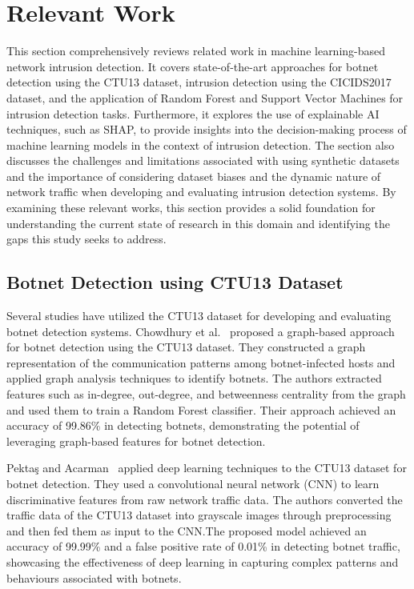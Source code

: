 \chapter{Relevant Work}

This section comprehensively reviews related work in machine learning-based network intrusion detection. It covers state-of-the-art approaches for botnet detection using the CTU13 dataset, intrusion detection using the CICIDS2017 dataset, and the application of Random Forest and Support Vector Machines for intrusion detection tasks. Furthermore, it explores the use of explainable AI techniques, such as SHAP, to provide insights into the decision-making process of machine learning models in the context of intrusion detection. The section also discusses the challenges and limitations associated with using synthetic datasets and the importance of considering dataset biases and the dynamic nature of network traffic when developing and evaluating intrusion detection systems. By examining these relevant works, this section provides a solid foundation for understanding the current state of research in this domain and identifying the gaps this study seeks to address.

\section{Botnet Detection using CTU13 Dataset}
Several studies have utilized the CTU13 dataset for developing and evaluating botnet detection systems. Chowdhury et al.~\cite{chowdhury2017botnet} proposed a graph-based approach for botnet detection using the CTU13 dataset. They constructed a graph representation of the communication patterns among botnet-infected hosts and applied graph analysis techniques to identify botnets. The authors extracted features such as in-degree, out-degree, and betweenness centrality from the graph and used them to train a Random Forest classifier. Their approach achieved an accuracy of 99.86\% in detecting botnets, demonstrating the potential of leveraging graph-based features for botnet detection.

Pektaş and Acarman~\cite{pektacs2019deep} applied deep learning techniques to the CTU13 dataset for botnet detection. They used a convolutional neural network (CNN) to learn discriminative features from raw network traffic data. The authors converted the traffic data of the CTU13 dataset into grayscale images through preprocessing and then fed them as input to the CNN.\@ The proposed model achieved an accuracy of 99.99\% and a false positive rate of 0.01\% in detecting botnet traffic, showcasing the effectiveness of deep learning in capturing complex patterns and behaviours associated with botnets.

